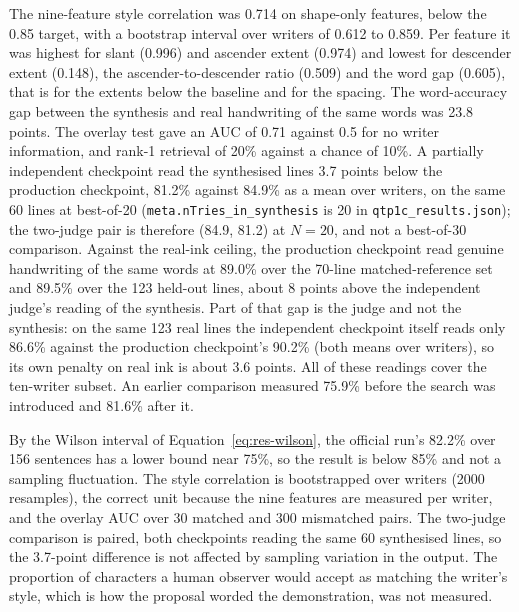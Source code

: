 
            The nine-feature style correlation was 0.714 on shape-only features, below the 0.85 target, with a bootstrap interval over writers of 0.612 to 0.859.
            Per feature it was highest for slant (0.996) and ascender extent (0.974) and lowest for descender extent (0.148), the ascender-to-descender ratio (0.509) and the word gap (0.605), that is for the extents below the baseline and for the spacing. The word-accuracy gap between the synthesis and real handwriting of the same words was 23.8 points.
            The overlay test gave an AUC of 0.71 against 0.5 for no writer information, and rank-1 retrieval of 20\% against a chance of 10\%.
            A partially independent checkpoint read the synthesised lines 3.7 points below the production checkpoint, 81.2\% against 84.9\% as a mean over writers, on the same 60 lines at best-of-20 (\texttt{meta.nTries\_in\_synthesis} is 20 in \texttt{qtp1c\_results.json}); the two-judge pair is therefore (84.9, 81.2) at $N=20$, and not a best-of-30 comparison.
            Against the real-ink ceiling, the production checkpoint read genuine handwriting of the same words at 89.0\% over the 70-line matched-reference set and 89.5\% over the 123 held-out lines, about 8 points above the independent judge's reading of the synthesis.
            Part of that gap is the judge and not the synthesis: on the same 123 real lines the independent checkpoint itself reads only 86.6\% against the production checkpoint's 90.2\% (both means over writers), so its own penalty on real ink is about 3.6 points.
            All of these readings cover the ten-writer subset.
            An earlier comparison measured 75.9\% before the search was introduced and 81.6\% after it.
            \NoHumanPanel



            By the Wilson interval of Equation~\ref{eq:res-wilson}, the official run's 82.2\% over 156 sentences has a lower bound near 75\%, so the result is below 85\% and not a sampling fluctuation.
            The style correlation is bootstrapped over writers (2000 resamples), the correct unit because the nine features are measured per writer, and the overlay AUC over 30 matched and 300 mismatched pairs.
            The two-judge comparison is paired, both checkpoints reading the same 60 synthesised lines, so the 3.7-point difference is not affected by sampling variation in the output.
            The proportion of characters a human observer would accept as matching the writer's style, which is how the proposal worded the demonstration, was not measured.

